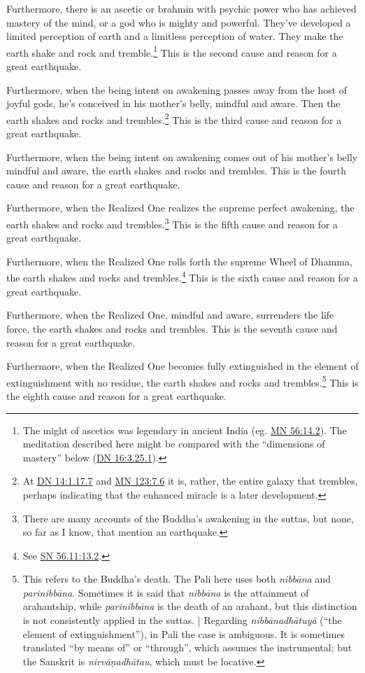 \documentclass[12pt,openany]{book}%
\begin{document}
Furthermore, there is an ascetic or brahmin with psychic power who has achieved mastery of the mind, or a god who is mighty and powerful. They’ve developed a limited perception of earth and a limitless perception of water. They make the earth shake and rock and tremble.\footnote{The might of ascetics was legendary in ancient India (eg. \href{https://suttacentral.net/mn56/en/sujato\#14.2}{MN 56:14.2}). The meditation described here might be compared with the “dimensions of mastery” below (\href{https://suttacentral.net/dn16/en/sujato\#3.25.1}{DN 16:3.25.1}). } This is the second cause and reason for a great earthquake. 

Furthermore, when the being intent on awakening passes away from the host of joyful gods, he’s conceived in his mother’s belly, mindful and aware. Then the earth shakes and rocks and trembles.\footnote{At \href{https://suttacentral.net/dn14/en/sujato\#1.17.7}{DN 14:1.17.7} and \href{https://suttacentral.net/mn123/en/sujato\#7.6}{MN 123:7.6} it is, rather, the entire galaxy that trembles, perhaps indicating that the enhanced miracle is a later development. } This is the third cause and reason for a great earthquake. 

Furthermore, when the being intent on awakening comes out of his mother’s belly mindful and aware, the earth shakes and rocks and trembles. This is the fourth cause and reason for a great earthquake. 

Furthermore, when the Realized One realizes the supreme perfect awakening, the earth shakes and rocks and trembles.\footnote{There are many accounts of the Buddha’s awakening in the suttas, but none, so far as I know, that mention an earthquake. } This is the fifth cause and reason for a great earthquake. 

Furthermore, when the Realized One rolls forth the supreme Wheel of Dhamma, the earth shakes and rocks and trembles.\footnote{See \href{https://suttacentral.net/sn56.11/en/sujato\#13.2}{SN 56.11:13.2}. } This is the sixth cause and reason for a great earthquake. 

Furthermore, when the Realized One, mindful and aware, surrenders the life force, the earth shakes and rocks and trembles. This is the seventh cause and reason for a great earthquake. 

Furthermore, when the Realized One becomes fully extinguished in the element of extinguishment with no residue, the earth shakes and rocks and trembles.\footnote{This refers to the Buddha’s death. The Pali here uses both \textit{\textsanskrit{nibbāna}} and \textit{\textsanskrit{parinibbāna}}. Sometimes it is said that \textit{\textsanskrit{nibbāna}} is the attainment of arahantship, while \textit{\textsanskrit{parinibbāna}} is the death of an arahant, but this distinction is not consistently applied in the suttas. | Regarding \textit{\textsanskrit{nibbānadhātuyā}} (“the element of extinguishment”), in Pali the case is ambiguous. It is sometimes translated “by means of” or “through”, which assumes the instrumental; but the Sanskrit is \textit{\textsanskrit{nirvāṇadhātau}}, which must be locative. } This is the eighth cause and reason for a great earthquake. 
\end{document}
